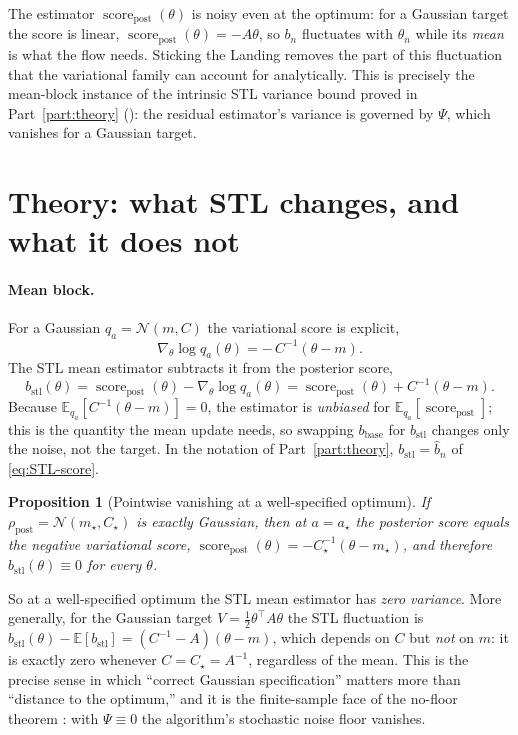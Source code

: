 \documentclass[11pt]{article}
\theoremstyle{plain}
\newtheorem{proposition}[proposition]{Proposition}
\theoremstyle{definition}
\theoremstyle{remark}
\newcommand{\N}{\mathcal{N}}
\newcommand{\E}{\mathbb{E}}
\newcommand{\post}{\mathrm{post}}
\newcommand{\bbase}{b_{\mathrm{base}}}
\newcommand{\bstl}{b_{\mathrm{stl}}}
\newcommand{\score}{\operatorname{score}_\post}
\begin{document}
The estimator $\score(\theta)$ is noisy even at the optimum: for a Gaussian
target the score is linear, $\score(\theta)=-A\theta$, so $b_n$ fluctuates with
$\theta_n$ while its \emph{mean} is what the flow needs. Sticking the Landing
\cite{roeder2017sticking} removes the part of this fluctuation that the variational family
can account for analytically. This is precisely the mean-block instance of the intrinsic
STL variance bound proved in Part~\ref{part:theory} (): the
residual estimator's variance is governed by $\Psi$, which vanishes for a Gaussian target.

\section{Theory: what STL changes, and what it does not}
\label{sec:num-theory}

\paragraph{Mean block.}
For a Gaussian $q_a=\N(m,C)$ the variational score is explicit,
\begin{equation}
\nabla_\theta\log q_a(\theta) = -\,C^{-1}(\theta-m).
\end{equation}
The STL mean estimator subtracts it from the posterior score,
\begin{equation}
\label{eq:bstl}
\bstl(\theta)
 = \score(\theta) - \nabla_\theta\log q_a(\theta)
 = \score(\theta) + C^{-1}(\theta-m).
\end{equation}
Because $\E_{q_a}[C^{-1}(\theta-m)]=0$, the estimator is \emph{unbiased} for
$\E_{q_a}[\score]$; this is the quantity the mean update needs, so swapping
$\bbase$ for $\bstl$ changes only the noise, not the target. In the notation of
Part~\ref{part:theory}, $\bstl=\widehat b_n$ of \eqref{eq:STL-score}.

\begin{proposition}[Pointwise vanishing at a well-specified optimum]
\label{prop:zero}
If $\rho_\post=\N(m_\star,C_\star)$ is exactly Gaussian, then at $a=a_\star$ the
posterior score equals the negative variational score,
$\score(\theta)=-C_\star^{-1}(\theta-m_\star)$, and therefore
$\bstl(\theta)\equiv 0$ for every $\theta$.
\end{proposition}

So at a well-specified optimum the STL mean estimator has \emph{zero variance}.
More generally, for the Gaussian target $V=\tfrac12\theta^\top A\theta$ the STL
fluctuation is
$\bstl(\theta)-\E[\bstl] = (C^{-1}-A)(\theta-m)$,
which depends on $C$ but \emph{not} on $m$: it is exactly zero whenever
$C=C_\star=A^{-1}$, regardless of the mean. This is the precise sense in which
``correct Gaussian specification'' matters more than ``distance to the optimum,'' and it
is the finite-sample face of the no-floor theorem : with
$\Psi\equiv0$ the algorithm's stochastic noise floor vanishes.
\end{document}
